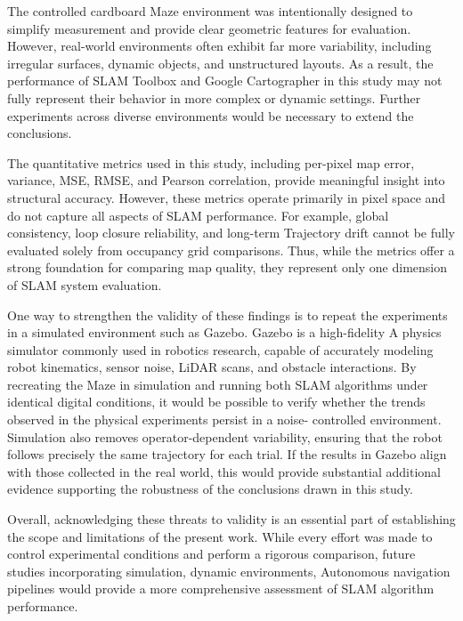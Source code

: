 \documentclass[runningheads,11pt]{llncs_bigfont_absbib}
\begin{document}
The controlled cardboard Maze environment was intentionally designed
to simplify measurement and provide clear geometric features for evaluation. However, real-world
environments often exhibit far more variability, including irregular surfaces, dynamic objects, and
unstructured layouts. As a result, the performance of SLAM Toolbox and Google Cartographer in
this study may not fully represent their behavior in more complex or dynamic settings. Further
experiments across diverse environments would be necessary to extend the conclusions.

The quantitative metrics used in this study, including per-pixel map
error, variance, MSE, RMSE, and Pearson correlation, provide meaningful insight into structural
accuracy. However, these metrics operate primarily in pixel space and do not capture all aspects of
SLAM performance. For example, global consistency, loop closure reliability, and long-term
Trajectory drift cannot be fully evaluated solely from occupancy grid comparisons. Thus, while the
metrics offer a strong foundation for comparing map quality, they represent only one dimension of
SLAM system evaluation.

One way to strengthen the validity of these findings is to
repeat the experiments in a simulated environment such as Gazebo. Gazebo is a high-fidelity
A physics simulator commonly used in robotics research, capable of accurately modeling robot
kinematics, sensor noise, LiDAR scans, and obstacle interactions. By recreating the Maze in
simulation and running both SLAM algorithms under identical digital conditions, it would be
possible to verify whether the trends observed in the physical experiments persist in a noise-
controlled environment. Simulation also removes operator-dependent variability, ensuring that the
robot follows precisely the same trajectory for each trial. If the results in Gazebo align with those
collected in the real world, this would provide substantial additional evidence supporting the robustness
of the conclusions drawn in this study.

Overall, acknowledging these threats to validity is an essential part of establishing the scope and
limitations of the present work. While every effort was made to control experimental conditions
and perform a rigorous comparison, future studies incorporating simulation, dynamic environments,
Autonomous navigation pipelines would provide a more comprehensive assessment of SLAM
algorithm performance.
\end{document}
